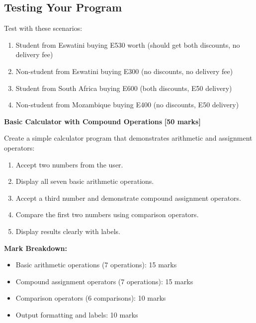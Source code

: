 \documentclass[a4paper,11pt]{article}
\theoremstyle{mytheor}
\begin{document}
\subsection*{Testing Your Program}

Test with these scenarios:
\begin{enumerate}
    \item Student from Eswatini buying E530 worth (should get both discounts, no delivery fee)
    \item Non-student from Eswatini buying E300 (no discounts, no delivery fee)
    \item Student from South Africa buying E600 (both discounts, E50 delivery)
    \item Non-student from Mozambique buying E400 (no discounts, E50 delivery)
\end{enumerate}
    
    \item \textbf{Basic Calculator with Compound Operations} \hfill \textbf{[50 marks]}
    
    Create a simple calculator program that demonstrates arithmetic and assignment operators:
    
    \begin{enumerate}
        \item Accept two numbers from the user.
        \item Display all seven basic arithmetic operations.
        \item Accept a third number and demonstrate compound assignment operators.
        \item Compare the first two numbers using comparison operators.
        \item Display results clearly with labels.
    \end{enumerate}
    
    \textbf{Mark Breakdown:}
    \begin{itemize}
        \item Basic arithmetic operations (7 operations): 15 marks
        \item Compound assignment operators (7 operations): 15 marks
        \item Comparison operators (6 comparisons): 10 marks
        \item Output formatting and labels: 10 marks
    \end{itemize}
    
\end{document}
